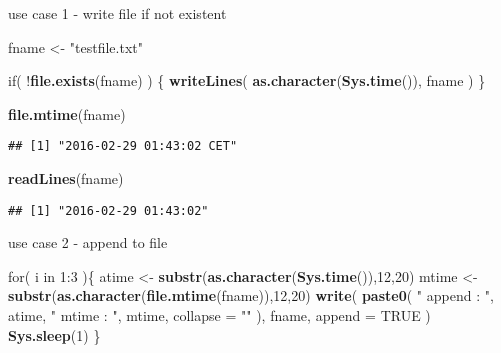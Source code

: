 \documentclass[ignorenonframetext,]{beamer}
\newenvironment{Shaded}{\begin{snugshade}}{\end{snugshade}}
\newcommand{\KeywordTok}[1]{\textcolor[rgb]{0.13,0.29,0.53}{\textbf{{#1}}}}
\newcommand{\DataTypeTok}[1]{\textcolor[rgb]{0.13,0.29,0.53}{{#1}}}
\newcommand{\DecValTok}[1]{\textcolor[rgb]{0.00,0.00,0.81}{{#1}}}
\newcommand{\StringTok}[1]{\textcolor[rgb]{0.31,0.60,0.02}{{#1}}}
\newcommand{\OtherTok}[1]{\textcolor[rgb]{0.56,0.35,0.01}{{#1}}}
\newcommand{\NormalTok}[1]{{#1}}
\begin{document}
\begin{frame}[fragile]{use case 1 - write file if not existent}

\begin{Shaded}
\begin{Highlighting}[]
\NormalTok{fname <-}\StringTok{ "testfile.txt"}

\NormalTok{if( !}\KeywordTok{file.exists}\NormalTok{(fname)  ) \{}
  \KeywordTok{writeLines}\NormalTok{( }\KeywordTok{as.character}\NormalTok{(}\KeywordTok{Sys.time}\NormalTok{()), fname )}
\NormalTok{\}}

\KeywordTok{file.mtime}\NormalTok{(fname)}
\end{Highlighting}
\end{Shaded}

\begin{verbatim}
## [1] "2016-02-29 01:43:02 CET"
\end{verbatim}

\begin{Shaded}
\begin{Highlighting}[]
\KeywordTok{readLines}\NormalTok{(fname)}
\end{Highlighting}
\end{Shaded}

\begin{verbatim}
## [1] "2016-02-29 01:43:02"
\end{verbatim}

\end{frame}

\begin{frame}[fragile]{use case 2 - append to file}

\begin{Shaded}
\begin{Highlighting}[]
\NormalTok{for( i in }\DecValTok{1}\NormalTok{:}\DecValTok{3} \NormalTok{)\{}
  \NormalTok{atime <-}\StringTok{ }\KeywordTok{substr}\NormalTok{(}\KeywordTok{as.character}\NormalTok{(}\KeywordTok{Sys.time}\NormalTok{()),}\DecValTok{12}\NormalTok{,}\DecValTok{20}\NormalTok{)}
  \NormalTok{mtime <-}\StringTok{ }\KeywordTok{substr}\NormalTok{(}\KeywordTok{as.character}\NormalTok{(}\KeywordTok{file.mtime}\NormalTok{(fname)),}\DecValTok{12}\NormalTok{,}\DecValTok{20}\NormalTok{)}
  \KeywordTok{write}\NormalTok{(}
    \KeywordTok{paste0}\NormalTok{(}
      \StringTok{" append : "}\NormalTok{, atime, }\StringTok{"   mtime : "}\NormalTok{, mtime, }
      \DataTypeTok{collapse =} \StringTok{""}
    \NormalTok{), }
    \NormalTok{fname, }
    \DataTypeTok{append =} \OtherTok{TRUE}
  \NormalTok{)}
  \KeywordTok{Sys.sleep}\NormalTok{(}\DecValTok{1}\NormalTok{)}
\NormalTok{\}}
\end{Highlighting}
\end{Shaded}

\end{frame}
\end{document}
